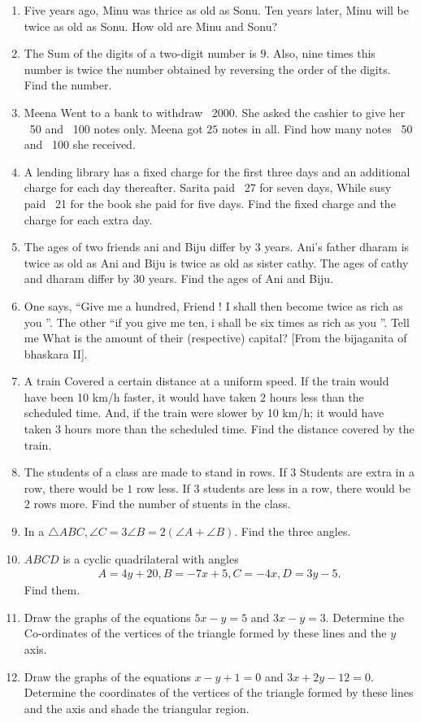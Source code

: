 \begin{enumerate}[label=\thesubsection.\arabic*,ref=\thesubsection.\theenumi]
\item Five years ago, Minu was thrice as old as Sonu. Ten years later, Minu will be twice as old as Sonu. How old are Minu and Sonu?
\item The Sum of the digits of a two-digit number is $9$. Also, nine times this number is twice the number obtained by reversing the order of the digits. Find the number.
\item Meena Went to a bank to withdraw \rupee~2000. She asked the cashier to give her \rupee~50 and \rupee~100 notes only. Meena got $25$ notes in all. Find how many notes \rupee~50 and \rupee~100 she received.
\item A lending library has a fixed charge for the first three days and an additional charge for each day thereafter. Sarita paid \rupee~27 for seven days, While susy paid \rupee~21 for the book she paid for five days. Find the fixed charge and the charge for each extra day.  
\item The ages of two friends ani and Biju differ  by $3$  years. Ani's father dharam is twice as old as Ani and Biju is twice as old as sister cathy. The ages of cathy and dharam differ by $30$ years. Find the ages of Ani and Biju.
\item  One says, \textquotedblleft Give me a hundred, Friend !  I shall then become twice as rich as you \textquotedblright. The other \textquotedblleft  if you give me ten, i shall be six times as rich as you \textquotedblright.  Tell me What is the amount of their (respective) capital? [From the bijaganita of bhaskara II]. 
\item A train Covered a certain distance at a uniform speed. If the train would have been 10 km/h faster, it would have taken $2$ hours less than the scheduled time. And, if the train were slower by 10 km/h; it would have taken $3$ hours more than the scheduled time. Find the distance covered by the train.
\item The students of a class are made to stand in rows. If 3 Students are extra in a row, there would be $1$ row less. If $3$ students are less in a row, there would be $2$ rows more. Find the number of stuents in the class.
\item In a $\triangle ABC, \angle C=3 \angle B=2(\angle A+\angle B)$. Find the three angles.
\item $ABCD$ is a cyclic quadrilateral 
	with angles
\begin{align}
	A = 4y+20, B = -7x+5, C = -4x, D = 3y-5.
\end{align}
Find them. 
\item Draw the graphs of the equations $5x-y=5$ and $3x-y=3$. Determine the Co-ordinates of the vertices of the triangle formed by these lines and the $y$ axis.
\item Draw the graphs of the equations $x-y+1=0$ and $3x+2y-12=0$. Determine the coordinates of the vertices of the triangle formed by these lines and the axis and shade the triangular region.
\end{enumerate}
